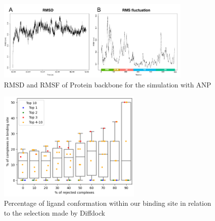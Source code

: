 \documentclass[11pt, letterpaper, titlepage]{article}
\begin{document}
\begin{figure}[h]
  \begin{center}
    \includegraphics[width=0.85\textwidth]{rms_ANP.pdf}
  \end{center}
  \caption{RMSD and RMSF of Protein backbone for the simulation with ANP}\label{anp}
\end{figure}

\begin{figure}[h]
  \begin{center}
    \includegraphics[width=7cm]{diffdock_percentage_graph}
  \end{center}
  \caption{Percentage of ligand conformation within our binding site in relation to the selection made by Diffdock}\label{Diffdock_plot}
\end{figure}


\pagebreak
\FloatBarrier
\renewcommand{\bibname}{References}  %
\printbibliography
\end{document}
